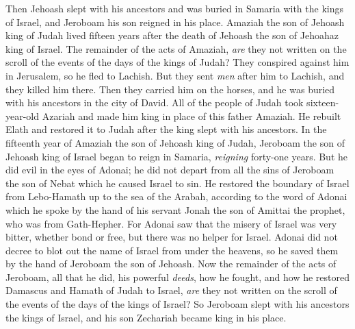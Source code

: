 \begin{biblechapter}
\verse Then Jehoash slept with his ancestors and was buried in Samaria with the kings of Israel, and Jeroboam his son reigned in his place.
 Amaziah the son of Jehoash king of Judah lived fifteen years after the death of Jehoash the son of Jehoahaz king of Israel.
\verse The remainder of the acts of Amaziah, \textit{are} they not written on the scroll of the events of the days of the kings of Judah?
\verse They conspired against him in Jerusalem, so he fled to Lachish. But they sent \textit{men} after him to Lachish, and they killed him there.
\verse Then they carried him on the horses, and he was buried with his ancestors in the city of David.
\verse All of the people of Judah took sixteen-year-old Azariah and made him king in place of this father Amaziah.
\verse He rebuilt Elath and restored it to Judah after the king slept with his ancestors.
\verse In the fifteenth year of Amaziah the son of Jehoash king of Judah, Jeroboam the son of Jehoash king of Israel began to reign in Samaria, \textit{reigning} forty-one years.
\verse But he did evil in the eyes of Adonai; he did not depart from all the sins of Jeroboam the son of Nebat which he caused Israel to sin.
\verse He restored the boundary of Israel from Lebo-Hamath up to the sea of the Arabah, according to the word of Adonai which he spoke by the hand of his servant Jonah the son of Amittai the prophet, who was from Gath-Hepher.
\verse For Adonai saw that the misery of Israel was very bitter, whether bond or free, but there was no helper for Israel.
\verse Adonai did not decree to blot out the name of Israel from under the heavens, so he saved them by the hand of Jeroboam the son of Jehoash.
\verse Now the remainder of the acts of Jeroboam, all that he did, his powerful \textit{deeds}, how he fought, and how he restored Damascus and Hamath of Judah to Israel, \textit{are} they not written on the scroll of the events of the days of the kings of Israel?
\verse So Jeroboam slept with his ancestors the kings of Israel, and his son Zechariah became king in his place.
\end{biblechapter}

